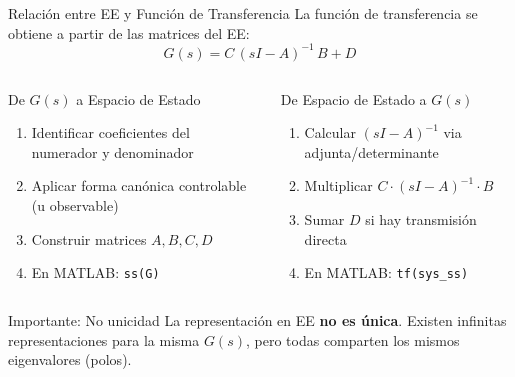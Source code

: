 \documentclass[aspectratio=169,xcolor=dvipsnames]{beamer}
\begin{document}
\begin{frame}{Relaci\'on entre EE y Funci\'on de Transferencia}
    La funci\'on de transferencia se obtiene a partir de las matrices del EE:
    \begin{equation}
        \boxed{G(s) = C\,(sI - A)^{-1}\,B + D}
    \end{equation}
    \vspace{0.3em}
    \begin{columns}
        \begin{block}{De $G(s)$ a Espacio de Estado}
            \begin{enumerate}
                \item Identificar coeficientes del numerador y denominador
                \item Aplicar forma can\'onica controlable (u observable)
                \item Construir matrices $A, B, C, D$
                \item En MATLAB: \texttt{ss(G)}
            \end{enumerate}
        \end{block}
        \begin{block}{De Espacio de Estado a $G(s)$}
            \begin{enumerate}
                \item Calcular $(sI-A)^{-1}$ via adjunta/determinante
                \item Multiplicar $C \cdot (sI-A)^{-1} \cdot B$
                \item Sumar $D$ si hay transmisi\'on directa
                \item En MATLAB: \texttt{tf(sys\_ss)}
            \end{enumerate}
        \end{block}
    \end{columns}
    \vspace{0.3em}
    \begin{alertblock}{Importante: No unicidad}
        La representaci\'on en EE \textbf{no es \'unica}. Existen infinitas representaciones para la misma $G(s)$, pero todas comparten los mismos eigenvalores (polos).
    \end{alertblock}
\end{frame}
\end{document}
